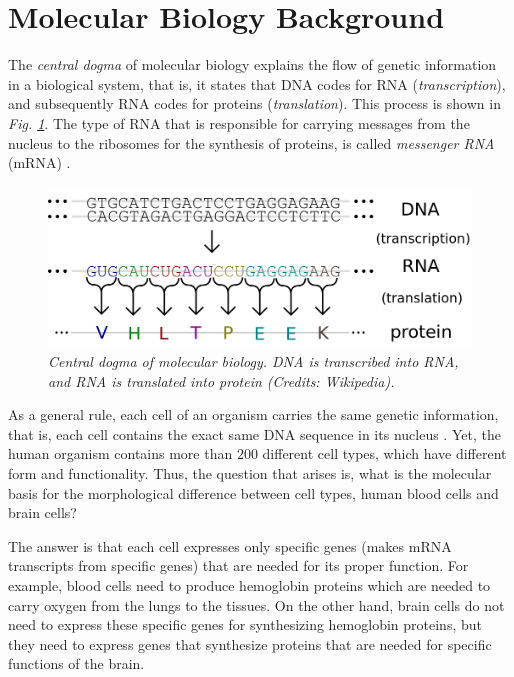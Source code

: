 \section{Molecular Biology Background} \label{molecular-back-sect}
The \emph{central dogma} of molecular biology explains the flow of genetic information in a biological system, that is, it states that DNA codes for RNA (\emph{transcription}), and subsequently RNA codes for proteins (\emph{translation}). This process is shown in \emph{Fig. \ref{central-dogma-pic}}. The type of RNA that is responsible for carrying messages from the nucleus to the ribosomes for the synthesis of proteins, is called \emph{messenger RNA} (mRNA) \citep{Jasny2001}. 
\vspace*{5mm}
\begin{figure}[!ht]
\begin{center}
 \includegraphics[scale = 0.39]{images/central-dogma3.png}
\caption{\emph{Central dogma of molecular biology. DNA is transcribed into RNA, and RNA is translated into protein (Credits: Wikipedia).}}
\label{central-dogma-pic}
\end{center}
\end{figure}

As a general rule, each cell of an organism carries the same genetic information, that is, each cell contains the exact same DNA sequence in its nucleus \citep{Jasny2001}. Yet, the human organism contains more than $200$ different cell types, which have different form and functionality. Thus, the question that arises is, what is the molecular basis for the morphological difference between cell types, \eg human blood cells and brain cells? 

The answer is that each cell expresses only specific genes (\ie makes mRNA transcripts from specific genes) that are needed for its proper function. For example, blood cells need to produce hemoglobin proteins which are needed to carry oxygen from the lungs to the tissues. On the other hand, brain cells do not need to express these specific genes for synthesizing hemoglobin proteins, but they need to express genes that synthesize proteins that are needed for specific functions of the brain.

